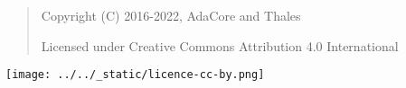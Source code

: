 \bigskip
\begin{quote}
   Copyright (C) 2016-2022, AdaCore and Thales

   Licensed under Creative Commons Attribution 4.0 International
\end{quote}

\texttt{[image: ../../\_static/licence-cc-by.png]}
\bigskip
